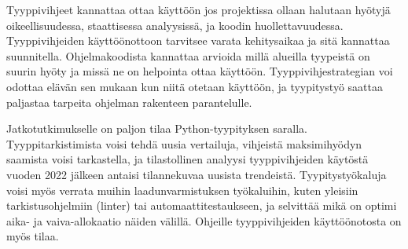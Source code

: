 \begin{otherlanguage}{finnish}
Tyyppivihjeet kannattaa ottaa käyttöön jos projektissa ollaan halutaan hyötyjä oikeellisuudessa, staattisessa analyysissä, ja koodin huollettavuudessa. Tyyppivihjeiden käyttöönottoon tarvitsee varata kehitysaikaa ja sitä kannattaa suunnitella. Ohjelmakoodista kannattaa arvioida millä alueilla tyypeistä on suurin hyöty ja missä ne on helpointa ottaa käyttöön. Tyyppivihjestrategian voi odottaa elävän sen mukaan kun niitä otetaan käyttöön, ja tyypitystyö saattaa paljastaa tarpeita ohjelman rakenteen parantelulle.

Jatkotutkimukselle on paljon tilaa Python-tyypityksen saralla. Tyyppitarkistimista voisi tehdä uusia vertailuja, vihjeistä maksimihyödyn saamista voisi tarkastella, ja tilastollinen analyysi tyyppivihjeiden käytöstä vuoden 2022 jälkeen antaisi tilannekuvaa uusista trendeistä. Tyypitystyökaluja voisi myös verrata muihin laadunvarmistuksen työkaluihin, kuten yleisiin tarkistusohjelmiin (linter) tai automaattitestaukseen, ja selvittää mikä on optimi aika- ja vaiva-allokaatio näiden välillä. Ohjeille tyyppivihjeiden käyttöönotosta on myös tilaa.
\end{otherlanguage}
